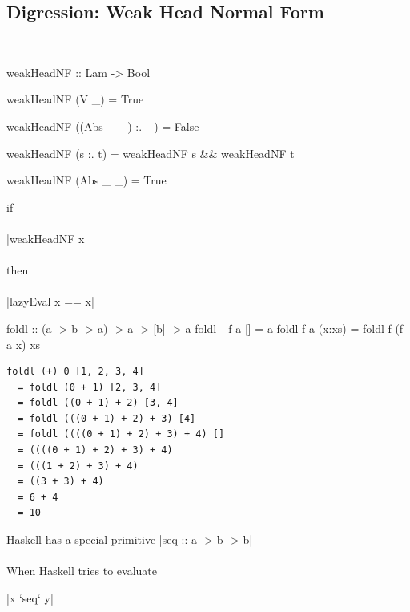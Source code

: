 \documentclass{beamer}
\begin{document}
\subsection{Digression: Weak Head Normal Form}
\begin{frame}{\insertsectionhead\ \textemdash\\
    \insertsubsectionhead}

\begin{code}
weakHeadNF :: Lam -> Bool

weakHeadNF (V _) = True

weakHeadNF ((Abs _ _) :. _) = False

weakHeadNF (s :. t) =
  weakHeadNF s && weakHeadNF t

weakHeadNF (Abs _ _) = True
\end{code}

\framebreak

\begin{claim}
\begin{center}
  if \\~\\
  |weakHeadNF x| \\~\\
  then \\~\\
  |lazyEval x == x|
\end{center}
\end{claim}

\framebreak

\begin{code}
foldl :: (a -> b -> a) -> a -> [b] -> a
foldl _f a [] = a
foldl f a (x:xs) = foldl f (f a x) xs
\end{code}

\framebreak

\begin{lstlisting}
foldl (+) 0 [1, 2, 3, 4]
  = foldl (0 + 1) [2, 3, 4]
  = foldl ((0 + 1) + 2) [3, 4]
  = foldl (((0 + 1) + 2) + 3) [4]
  = foldl ((((0 + 1) + 2) + 3) + 4) []
  = ((((0 + 1) + 2) + 3) + 4)
  = (((1 + 2) + 3) + 4)
  = ((3 + 3) + 4)
  = 6 + 4
  = 10
\end{lstlisting}

\framebreak

Haskell has a special primitive |seq :: a -> b -> b| \\~\\

When Haskell tries to evaluate

\begin{center}
  |x `seq` y|
\end{center}


\end{frame}
\end{document}
